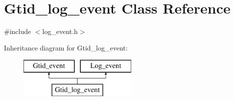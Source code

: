 \hypertarget{classGtid__log__event}{}\section{Gtid\+\_\+log\+\_\+event Class Reference}
\label{classGtid__log__event}


{\ttfamily \#include $<$log\+\_\+event.\+h$>$}

Inheritance diagram for Gtid\+\_\+log\+\_\+event\+:\begin{figure}[H]
\begin{center}
\leavevmode
\includegraphics[height=2.000000cm]{classGtid__log__event}
\end{center}
\end{figure}
